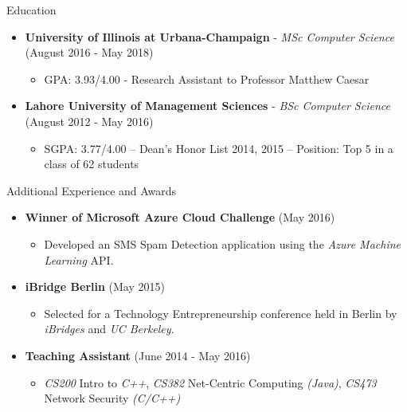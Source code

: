 \documentclass[]{Gohar_CV_Jobs}
\begin{document}
    \begin{cvsection}{Education}
        \begin{cvsubsection}{}{}{}
            \begin{itemize}
                \item \textbf{University of Illinois at Urbana-Champaign} - \textit{MSc Computer Science} \hfill(August 2016 - May 2018)
                    \begin{itemize}
                        \item GPA: 3.93/4.00 - Research Assistant to Professor Matthew Caesar
                    \end{itemize}
                \item \textbf{Lahore University of Management Sciences} - \textit{BSc Computer Science} \hfill(August 2012 - May 2016)
                    \begin{itemize}
                        \item SGPA: 3.77/4.00 – Dean’s Honor List 2014, 2015 – Position: Top 5 in a class of 62 students
                    \end{itemize}
            \end{itemize}
        \end{cvsubsection}
    \end{cvsection}
    
    \begin{cvsection}{Additional Experience and Awards}
        \begin{cvsubsection}{}{}{}  
            \begin{itemize}
                \item \textbf{Winner of Microsoft Azure Cloud Challenge} \hfill(May 2016)
                    \begin{itemize}
                        \item Developed an SMS Spam Detection application using the \textit{Azure Machine Learning} API.
                    \end{itemize}
                \item \textbf{iBridge Berlin} \hfill(May 2015) 
                    \begin{itemize}
                        \item Selected for a Technology Entrepreneurship conference held in Berlin by \textit{iBridges} and \textit{UC Berkeley}.
                    \end{itemize}
                \item \textbf{Teaching Assistant} \hfill(June 2014 - May 2016) 
                    \begin{itemize}
                        \item \textit{CS200} Intro to \textit{C++}, \textit{CS382} Net-Centric Computing \textit{(Java)}, \textit{CS473} Network Security \textit{(C/C++)}
                    \end{itemize}
            \end{itemize}
        \end{cvsubsection}
    \end{cvsection}
\end{document}

